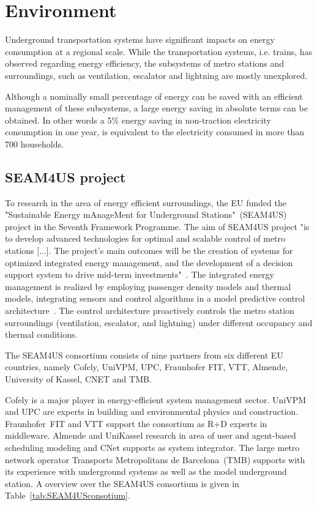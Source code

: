 \section{Environment}
\label{sec:environment}

Underground transportation systems have significant impacts on energy consumption at a regional scale. While the transportation systems, i.e. trains, has observed regarding energy efficiency, the subsystems of metro stations and surroundings, such as ventilation, escalator and lightning are mostly unexplored.

Although a nominally small percentage of energy can be saved with an efficient management of these subsystems, a large energy saving in absolute terms can be obtained. In other words a 5\% energy saving in non-traction electricity consumption in one year, is equivalent to the electricity consumed in more than 700 households. 

\subsection{SEAM4US project}
\label{subsec:seam4us}

To research in the area of energy efficient surroundings, the EU funded the "Sustainable Energy mAnageMent for Underground Stations"~(SEAM4US) project in the Seventh Framework Programme.
The aim of SEAM4US project "is to develop advanced technologies for optimal and scalable control of metro stations [...]. The project's main outcomes will be the creation of systems for optimized integrated energy management, and the development of a decision support system to drive mid-term investments"~\cite{SEAM4US_Website}.
The integrated energy management is realized by employing passenger density models and thermal models, integrating sensors and control algorithms in a model predictive control architecture~\cite{ansuini_models_2013}. The control architecture proactively controls the metro station surroundings (ventilation, escalator, and lightning) under different occupancy and thermal conditions.

The SEAM4US consortium consists of nine partners from six different EU countries, namely Cofely, UniVPM, UPC, Fraunhofer FIT, VTT, Almende, University of Kassel, CNET and TMB.

Cofely is a major player in energy-efficient system management sector.
UniVPM and UPC are experts in building and environmental physics and construction.
Fraunhofer~FIT and VTT support the consortium as R+D experts in middleware.
Almende and UniKassel research in area of user and agent-based scheduling modeling and CNet supports as system integrator.
The large metro network operator Transports Metropolitans de Barcelona~(TMB) supports with its experience with underground systems as well as the model underground station.
A overview over the SEAM4US consortium is given in Table~\ref{tab:SEAM4USconsotium}.

